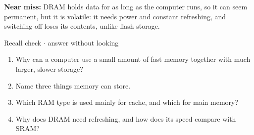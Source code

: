 \documentclass[11pt]{article}
\begin{document}
\begin{keepsection}
\begin{keepsection}
\begin{notebox}\textbf{Near miss:} DRAM holds data for as long as the computer runs, so it can seem permanent, but it is volatile: it needs power and constant refreshing, and switching off loses its contents, unlike flash storage.\end{notebox}

\begin{recallbox}{Recall check \ensuremath{\cdot} answer without looking}
\begin{enumerate}
\item Why can a computer use a small amount of fast memory together with much larger, slower storage?
\item Name three things memory can store.
\item Which RAM type is used mainly for cache, and which for main memory?
\item Why does DRAM need refreshing, and how does its speed compare with SRAM?
\end{enumerate}

\end{recallbox}
\end{keepsection}
\end{keepsection}
\end{document}
